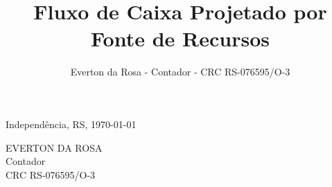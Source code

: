 \documentclass[12pt, a4paper]{report}
\title{Fluxo de Caixa Projetado por Fonte de Recursos}
\author{Everton da Rosa - Contador - CRC RS-076595/O-3}
\begin{document}
\maketitle

\begin{landscape}

\end{landscape}



\vspace{16pt}

\begin{center}
	Independência, RS, \today
\end{center}

\vspace{36pt}

\begin{center}
	EVERTON DA ROSA\\
	Contador\\
	CRC RS-076595/O-3
\end{center}
\end{document}
